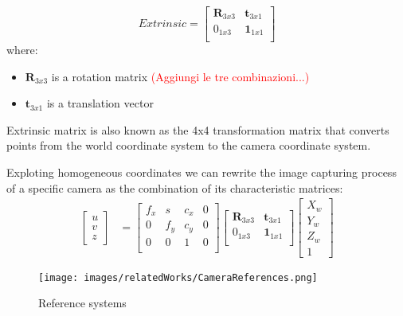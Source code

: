 \[
  Extrinsic= \begin{bmatrix}
    \textbf{R}_{3x3} & \textbf{t}_{3x1}  \\
    0_{1x3} & \textbf{1}_{1x1}  \\
  \end{bmatrix}
\]
where:
\begin{itemize}
    \item $\textbf{R}_{3x3}$ is a rotation matrix
    \textcolor{red}{(Aggiungi le tre combinazioni...)}
    \item $\textbf{t}_{3x1}$ is a translation vector
\end{itemize}
Extrinsic matrix is also known as the 4x4 transformation matrix 
that converts points from the world coordinate system to the camera
coordinate system.

Exploting homogeneous coordinates we can rewrite the image capturing 
process of a specific camera as the combination of its characteristic matrices:
\begin{align*}
    \begin{bmatrix}
        u \\
        v \\
        z
      \end{bmatrix}
    &= \begin{bmatrix}
        f_{x} & s & c_{x} & 0 \\
        0 & f_{y} & c_{y} & 0\\
        0 & 0     & 1     & 0\\
      \end{bmatrix} \begin{bmatrix}
        \textbf{R}_{3x3} & \textbf{t}_{3x1}  \\
        0_{1x3} & \textbf{1}_{1x1}  \\
      \end{bmatrix}
      \begin{bmatrix}
        X_w \\
        Y_w \\
        Z_w \\
        1    
      \end{bmatrix}
  \end{align*}


  \begin{figure}
    \centering
    \texttt{[image: images/relatedWorks/CameraReferences.png]} %
    \caption{Reference systems}
    \label{fig:reference_systems}
  \end{figure}






